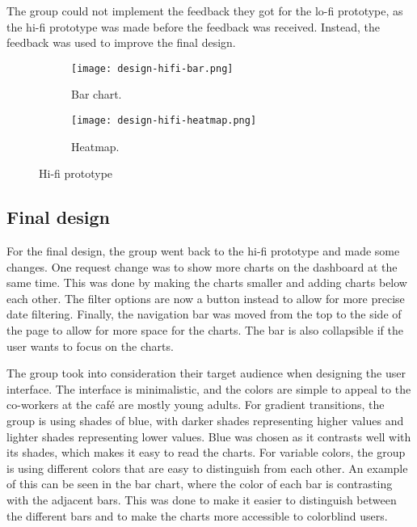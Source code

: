 The group could not implement the feedback they got for the lo-fi prototype, as the hi-fi prototype was made before
the feedback was received.
Instead, the feedback was used to improve the final design.

\begin{figure}[H]
    \centering
    \begin{subfigure}{.75\textwidth}
        \centering
        \texttt{[image: design-hifi-bar.png]}
        \caption{Bar chart.}\label{subfig:hifi-bar}
    \end{subfigure}
    \par\medskip
    \begin{subfigure}{.75\textwidth}
        \centering
        \texttt{[image: design-hifi-heatmap.png]}
        \caption{Heatmap.}\label{subfig:hifi-heatmap}
    \end{subfigure}
    \caption{Hi-fi prototype}\label{fig:hifi-prototype}
\end{figure}

\subsection{Final design}

For the final design, the group went back to the hi-fi prototype and made some changes.
One request change was to show more charts on the dashboard at the same time.
This was done by making the charts smaller and adding charts below each other.
The filter options are now a button instead to allow for more precise date filtering.
Finally, the navigation bar was moved from the top to the side of the page to allow for more space for the charts.
The bar is also collapsible if the user wants to focus on the charts.

The group took into consideration their target audience when designing the user interface.
The interface is minimalistic, and the colors are simple to appeal to the co-workers at the café are mostly young adults.
For gradient transitions, the group is using shades of blue, with darker shades representing higher values and lighter
shades representing lower values.
Blue was chosen as it contrasts well with its shades, which makes it easy to read the charts.
For variable colors, the group is using different colors that are easy to distinguish from each other.
An example of this can be seen in the bar chart, where the color of each bar is contrasting with the adjacent bars.
This was done to make it easier to distinguish between the different bars and to make the charts more accessible to
colorblind users.

